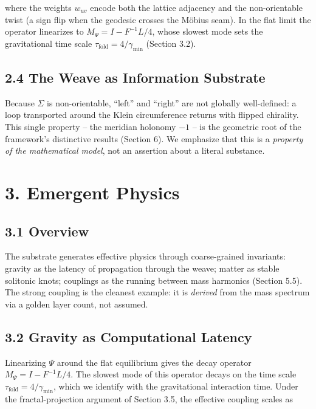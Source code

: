 \documentclass[
  11pt,
]{article}
\begin{document}
where the weights \(w_{uv}\) encode both the lattice adjacency and the
non-orientable twist (a sign flip when the geodesic crosses the Möbius
seam). In the flat limit the operator linearizes to
\(M_\Psi = I - F^{-1}L/4\), whose slowest mode sets the gravitational
time scale \(\tau_{\text{fold}} = 4/\gamma_{\min}\) (Section 3.2).

\subsection{2.4 The Weave as Information
Substrate}\label{the-weave-as-information-substrate}

Because \(\Sigma\) is non-orientable, ``left'' and ``right'' are not
globally well-defined: a loop transported around the Klein circumference
returns with flipped chirality. This single property -- the meridian
holonomy \(-1\) -- is the geometric root of the framework's distinctive
results (Section 6). We emphasize that this is a \emph{property of the
mathematical model}, not an assertion about a literal substance.

\section{3. Emergent Physics}\label{emergent-physics}

\subsection{3.1 Overview}\label{overview}

The substrate generates effective physics through coarse-grained
invariants: gravity as the latency of propagation through the weave;
matter as stable solitonic knots; couplings as the running between mass
harmonics (Section 5.5). The strong coupling is the cleanest example: it
is \emph{derived} from the mass spectrum via a golden layer count, not
assumed.

\subsection{3.2 Gravity as Computational
Latency}\label{gravity-as-computational-latency}

Linearizing \(\Psi\) around the flat equilibrium gives the decay
operator \(M_\Psi = I - F^{-1}L/4\). The slowest mode of this operator
decays on the time scale \(\tau_{\text{fold}} = 4/\gamma_{\min}\), which
we identify with the gravitational interaction time. Under the
fractal-projection argument of Section 3.5, the effective coupling
scales as
\end{document}
